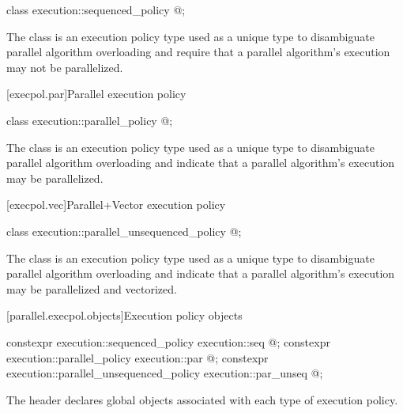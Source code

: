 %
\begin{itemdecl}
class execution::sequenced_policy { @\unspec@ };
\end{itemdecl}

\begin{itemdescr}
\pnum
The class  is an execution policy type used
as a unique type to disambiguate parallel algorithm overloading and require
that a parallel algorithm's execution may not be parallelized.
\end{itemdescr}

[execpol.par]{Parallel execution policy}

%
\begin{itemdecl}
class execution::parallel_policy { @\unspec@ };
\end{itemdecl}

\begin{itemdescr}
\pnum
The class  is an execution policy type used as
a unique type to disambiguate parallel algorithm overloading and indicate that
a parallel algorithm's execution may be parallelized.
\end{itemdescr}

[execpol.vec]{Parallel+Vector execution policy}

%
\begin{itemdecl}
class execution::parallel_unsequenced_policy { @\unspec@ };
\end{itemdecl}

\begin{itemdescr}
\pnum
The class  is an execution policy type
used as a unique type to disambiguate parallel algorithm overloading and
indicate that a parallel algorithm's execution may be parallelized and
vectorized.
\end{itemdescr}

[parallel.execpol.objects]{Execution policy objects}

%
%
%
%
%
%
\begin{itemdecl}
constexpr execution::sequenced_policy            execution::seq{ @\unspec@ };
constexpr execution::parallel_policy             execution::par{ @\unspec@ };
constexpr execution::parallel_unsequenced_policy execution::par_unseq{ @\unspec@ };
\end{itemdecl}

\begin{itemdescr}
\pnum
The header  declares global objects associated with each type of execution policy.
\end{itemdescr}
